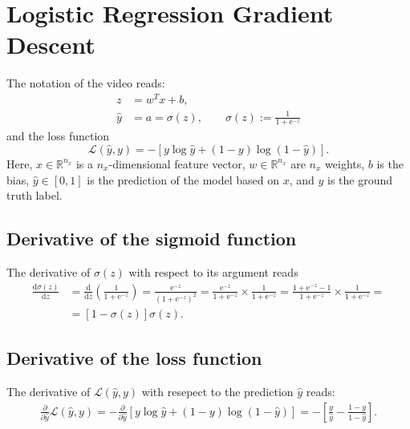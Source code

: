 \documentclass[a4paper,11pt]{article}
\newcommand{\of}[1]{\left( {#1} \right)}
\newcommand{\ofs}[1]{\left[ {#1} \right]}
\newcommand{\fracd}[2]{\frac{\dd{}{#1}}{\dd{}{#2}}}
\newcommand{\fracp}[2]{\frac{\partial{}{#1}}{\partial{}{#2}}}
\newcommand{\dd}{\text{d}}
\newcommand{\ee}{\text{e}}
\begin{document}
\section*{Logistic Regression Gradient Descent}
The notation of the video reads:
\[
\begin{split}
z & = w^T x + b,\\
\hat y &= a = \sigma\of{z}, \qquad \sigma\of{z} := \frac{1}{1 + \ee^{-z}}
\end{split}
\]
and the loss function
\[
\mathcal{L}\of{\hat{y}, y} = - \ofs{y \log\hat{y} + \of{1 - y} \log \of {1 - \hat{y}}}.
\]
Here, $x \in \mathbb{R}^{n_x}$ is a $n_x$-dimensional feature vector,
$w \in \mathbb{R}^{n_x}$ are $n_x$ weights, $b$ is the bias, $\hat{y}
\in [0, 1]$ is the prediction of the model based on $x$, and $y$ is
the ground truth label.

\subsection*{Derivative of the sigmoid function}
The derivative of $\sigma\of{z}$ with respect to its argument reads
\[
\begin{split}
\fracd{\sigma\of{z}}{z} &= \fracd{}{z}\of{\frac{1}{1 + \ee^{-z}}}
                        = \frac{\ee^{-z}}{\of{1 + \ee^{-z}}^2}
                        = \frac{\ee^{-z}}{1 + \ee^{-z}} \times \frac{1}{1 + \ee^{-z}}
                        = \frac{1 + \ee^{-z} - 1}{1 + \ee^{-z}} \times \frac{1}{1 + \ee^{-z}} =\\
                        &= \ofs{1 - \sigma\of{z}} \sigma\of{z}.
\end{split}
\]

\subsection*{Derivative of the loss function}
The derivative of $\mathcal{L}\of{\hat{y}, y}$ with resepect to the prediction $\hat{y}$ reads:
\[
\begin{split}
\fracp{}{\hat{y}} \mathcal{L}\of{\hat{y}, y} =
- \fracp{}{\hat{y}} \ofs{y \log\hat{y} + \of{1 - y} \log \of {1 - \hat{y}}} =
- \ofs{\frac{y}{\hat{y}} - \frac{1 - y}{1 - \hat{y}}}.
\end{split}
\]
\end{document}
